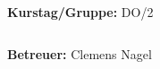 \documentclass[12pt,a4paper]{article}
\begin{document}
\begin{verbatim}


\end{verbatim}
			\begin{flushleft}
			\textbf{\Large{Kurstag/Gruppe:}} \Large{DO/2}
			\end{flushleft}

\begin{verbatim}

\end{verbatim}
			\begin{flushleft}
			\LARGE{\textbf{Betreuer:}}	\Large{ Clemens Nagel }	
			\end{flushleft}

\pagebreak
\setlength{\columnsep}{20pt}
\end{document}
